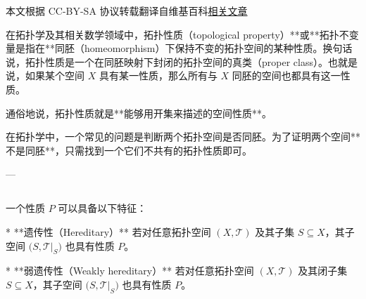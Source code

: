 
本文根据 CC-BY-SA 协议转载翻译自维基百科\href{https://en.wikipedia.org/wiki/Topological_property}{相关文章}

在拓扑学及其相关数学领域中，拓扑性质（topological property）**或**拓扑不变量是指在**同胚（homeomorphism）\*\*下保持不变的拓扑空间的某种性质。换句话说，拓扑性质是一个在同胚映射下封闭的拓扑空间的真类（proper class）。也就是说，如果某个空间 $X$ 具有某一性质，那么所有与 $X$ 同胚的空间也都具有这一性质。

通俗地说，拓扑性质就是**能够用开集来描述的空间性质**。

在拓扑学中，一个常见的问题是判断两个拓扑空间是否同胚。为了证明两个空间**不是同胚**，只需找到一个它们不共有的拓扑性质即可。

---

\subsection{ }

一个性质 $P$ 可以具备以下特征：

* **遗传性（Hereditary）**
  若对任意拓扑空间 $(X, \mathcal{T})$ 及其子集 $S \subseteq X$，其子空间 $\bigl(S, \mathcal{T}|_S\bigr)$ 也具有性质 $P$。

* **弱遗传性（Weakly hereditary）**
  若对任意拓扑空间 $(X, \mathcal{T})$ 及其闭子集 $S \subseteq X$，其子空间 $\bigl(S, \mathcal{T}|_S\bigr)$ 也具有性质 $P$。
